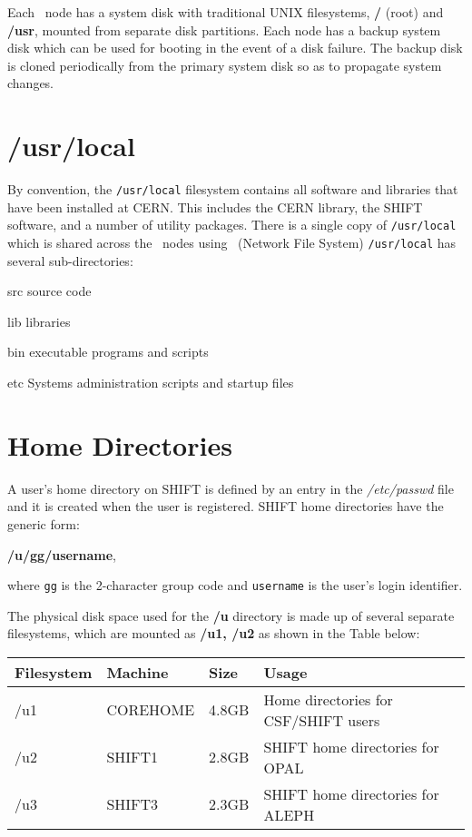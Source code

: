 Each \shift\
node has a system disk with traditional UNIX filesystems,
{\bf /} (root) and {\bf/usr},
mounted from separate disk partitions.
Each node has a backup system disk which can be used for booting in the
event of a disk failure. The backup disk is cloned periodically
from the primary system disk so as to propagate system changes.
 
\section {/usr/local}
By convention, the {\tt/usr/local} filesystem contains all
software and libraries that have been installed at CERN.
This includes the CERN library, the SHIFT software, and a number
of utility packages.
There is a single copy of {\tt/usr/local} which is shared across
the \shift\ nodes using \NFS\ (Network File System)
{\tt/usr/local} has several sub-directories:
 
\begin{Lentry}
\item [src]
source code
\item [lib]
libraries
\item [bin]
executable programs and scripts
\item [etc]
Systems administration scripts and startup files
\end{Lentry}
 
\section {Home Directories}
A user's home directory on SHIFT is defined by an entry in the
{\it /etc/passwd}
file and it is created when the user is registered.
SHIFT home directories have the generic form:
\begin {center}
{\bf /u/gg/username},
\end {center}
 
where
{\tt gg}
is the 2-character group code and
{\tt username}
is the user's login identifier.
 
The physical disk space used for the
{\bf /u}
directory is made up of several separate filesystems,
which are mounted as
{\bf /u1, /u2}
as shown in the Table below:
 
\begin{center}
\begin{tabular}{llll}
Filesystem& Machine& Size &Usage  \\
\hline
/u1&COREHOME& 4.8GB &Home directories for CSF/SHIFT users \\
/u2&SHIFT1  & 2.8GB &SHIFT home directories for OPAL      \\
/u3&SHIFT3  & 2.3GB &SHIFT home directories for ALEPH     \\
\end{tabular}
\end{center}
 
